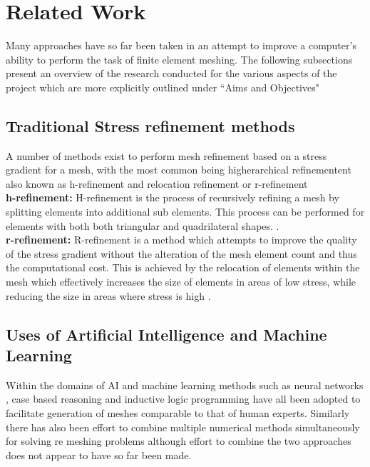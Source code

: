 
\section{Related Work}

Many approaches have so far been taken in an attempt to improve a computer's ability to perform the task of finite element meshing. The following subsections present an overview of the research conducted for the various aspects of the project which are more explicitly outlined under ``Aims and Objectives"

\subsection{Traditional Stress refinement methods}

A number of methods exist to perform mesh refinement based on a stress gradient for a mesh, with the most common being higherarchical refinementent also known as h-refinement and relocation refinement or r-refinement\cite{HandPRefinements} \cite{RRefinement}\\ 

\noindent
\textbf{h-refinement: }
H-refinement is the process of recursively refining a mesh by splitting elements into additional sub elements. This process can be performed for elements with both both triangular and quadrilateral shapes. \cite{HandPRefinements}. \\ 

\noindent
\textbf{r-refinement: }
R-refinement is a method which attempts to improve the quality of the stress gradient without the alteration of the mesh element count and thus the computational cost. This is achieved by the relocation of elements within the mesh which effectively increases the size of elements in areas of low stress, while reducing the size in areas where stress is high \cite{RRefinement}.


\subsection{Uses of Artificial Intelligence and Machine Learning}

\noindent
Within the domains of AI and machine learning methods such as neural networks \cite{NeuralNetworks}, case based reasoning \cite{caseBasedReasoning} and inductive logic programming \cite{DolsakPaper94} have all been adopted to facilitate generation of meshes comparable to that of human experts.  Similarly there has also been effort to combine multiple numerical methods simultaneously for solving re meshing problems \cite{TraditionalHybridRefinement} although effort to combine the two approaches does not appear to have so far been made.\\ 

